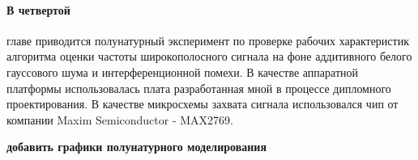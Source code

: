\paragraph{В четвертой} главе приводится полунатурный эксперимент по проверке рабочих характеристик алгоритма
оценки частоты широкополосного сигнала на фоне аддитивного белого гауссового шума и интерференционной помехи.
В качестве аппаратной платформы использовалась плата разработанная мной в процессе дипломного проектирования.
В качестве микросхемы захвата сигнала использовался чип от компании Maxim Semiconductor - MAX2769.

{\bf{добавить графики полунатурного моделирования}}






%
%
%
